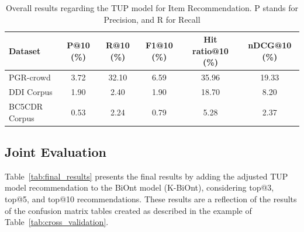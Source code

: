 \begin{table}[h]
\centering
  \caption[Results for Item Recommendation with TUP]{Overall results regarding the TUP model for Item Recommendation. P stands for Precision, and R for Recall}
  \label{tab:ir_results}
  \begin{tabular}{lccccc}
    \hline
    Dataset & P@10 (\%) & R@10 (\%) & F1@10 (\%) & Hit ratio@10 (\%) & nDCG@10 (\%) \\
    \hline
    PGR-crowd & 3.72 & 32.10 & 6.59 & 35.96 & 19.33 \\
    \hline
    DDI Corpus & 1.90 & 2.40 & 1.90 & 18.70 & 8.20 \\
    \hline
    BC5CDR Corpus & 0.53 & 2.24 & 0.79 & 5.28 & 2.37 \\
    \hline
  \end{tabular}
\end{table}


\subsection{Joint Evaluation}

Table~\ref{tab:final_results} presents the final results by adding the adjusted TUP model recommendation to the BiOnt model (K-BiOnt), considering  top@3, top@5, and top@10 recommendations. These results are a reflection of the results of the confusion matrix tables created as described in the example of Table~\ref{tab:cross_validation}.  

